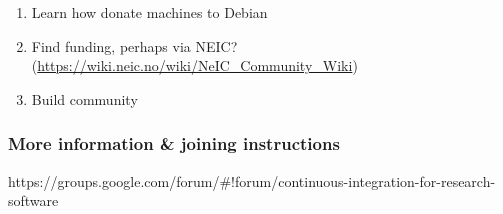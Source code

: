 \begin{enumerate}
\item Learn how donate machines to Debian
\item Find funding, perhaps via NEIC? (\url{https://wiki.neic.no/wiki/NeIC_Community_Wiki}) 
\item Build community
\end{enumerate}


\subsubsection{More information \& joining instructions}

https://groups.google.com/forum/#!forum/continuous-integration-for-research-software

